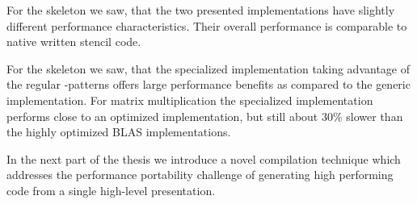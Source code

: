 For the \stencil skeleton we saw, that the two presented implementations have slightly different performance characteristics.
Their overall performance is comparable to native written stencil code.

For the \allpairs skeleton we saw, that the specialized implementation taking advantage of the regular \zip-\reduce patterns offers large performance benefits as compared to the generic implementation.
For matrix multiplication the specialized implementation performs close to an optimized \OpenCL implementation, but still about 30\% slower than the highly optimized BLAS implementations.

\bigskip

In the next part of the thesis we introduce a novel compilation technique which addresses the performance portability challenge of generating high performing code from a single high-level presentation.

